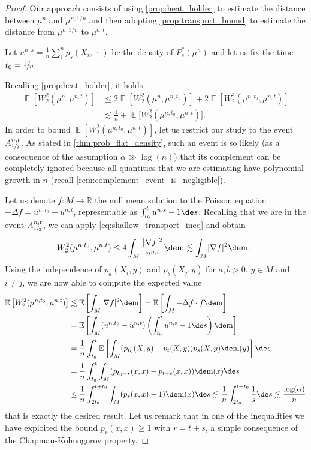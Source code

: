 \documentclass[JEP,XML,SOM,Unicode]{cedram}
\theoremstyle{plain}
\theoremstyle{definition}
\numberwithin{equation}{section}
\newcommand{\RR}{\ensuremath{\mathbb R}}
\newcommand{\E}[1]{\ensuremath{\operatorname{\mathbb{E}}\left[#1\right]}}
\newcommand{\bE}[1]{\ensuremath{\operatorname{\mathbb{E}}\bigl[#1\bigr]}}
\newcommand{\emptyparam}{\ensuremath{\,\cdot\,}}
\newcommand{\lapl}{\ensuremath{\Delta}}
\newcommand{\fullstop}{\ensuremath{\text{. }}}
\newcommand{\m}{\ensuremath{\mathrm m}}
\DeclarePairedDelimiter\abs{\lvert}{\rvert}
\begin{document}
\begin{proof}
Our approach consists of using \cref{prop:heat_holder} to estimate the distance between $\mu^n$ and
$\mu^{n,1/n}$ and then adopting \cref{prop:transport_bound} to estimate the distance
from $\mu^{n,1/n}$ to $\mu^{n,t}$.

Let $u^{n,s}=\frac 1n\sum_1^np_s(X_i,\emptyparam)$ be the density of $P_s^*(\mu^n)$ and
let us fix the time $t_0=\sfrac1n$.

Recalling \cref{prop:heat_holder}, it holds
\begin{align*}
\E{W_2^2(\mu^n, \mu^{n,t})}&\le 2\E{W_2^2(\mu^n, \mu^{n,t_0})} + 2\E{W_2^2(\mu^{n,t_0}, \mu^{n,t})} \\
&\lesssim \frac1n + \bE{W_2^2(\mu^{n,t_0}, \mu^{n,t})}.
\end{align*}
In order to bound $\E{W_2^2(\mu^{n,t_0}, \mu^{n,t})}$, let us restrict our study to the event
$A^{n,t}_{\sfrac12}$.
As stated in \cref{thm:prob_flat_density}, such an event is so likely (as a consequence of the
assumption $\alpha\gg\log(n)$) that its complement can be completely ignored because all
quantities that we are estimating have polynomial growth in $n$ (recall
\cref{rem:complement_event_is_negligible}).

Let us denote $f:M\to\RR$ the null mean solution to the Poisson equation $-\lapl f = u^{n,t_0}-u^{n,t}$,
representable as $\int_{t_0}^t u^{n,s}-1\de s$.
Recalling that we are in the event $A^{n,t}_{\sfrac12}$, we can apply \cref{eq:shallow_transport_ineq}
and obtain
\begin{equation*}
W_2^2(\mu^{n,t_0}, \mu^{n,t})\le
4\int_M \frac{\abs{\nabla f}^2}{u^{n,t}}\de\m \lesssim \int_M \abs{\nabla f}^2\de\m \fullstop
\end{equation*}
Using the independence of $p_a(X_i,y)$ and $p_b(X_j,y)$ for $a,b>0$, $y\in M$ and $i\neq j$,
we are now able to compute the expected value
\begin{align*}
\E{W_2^2(\mu^{n,t_0}, \mu^{n,t})} &\lesssim
\E{\int_M \abs{\nabla f}^2\de\m}
= \E{\int_M -\lapl f \cdot f\de\m} \\
&= \E{\int_M (u^{n,t_0}-u^{n,t})\left(\int_{t_0}^t u^{n,s}-1\de s\right)\de\m} \\
&=\frac1n\int_{t_0}^t\E{\int_M (p_{t_0}(X, y)-p_t(X,y))p_s(X,y)\de\m(y)} \de s \\
&=\frac1n\int_{t_0}^t\int_M (p_{t_0+s}(x, x)-p_{t+s}(x,x))\de\m(x) \de s\\
&\le \frac1n\int_{2t_0}^{t+t_0}\int_M (p_{s}(x, x)-1)\de\m(x) \de s
\lesssim\frac1n\int_{2t_0}^{t+t_0}\frac1s \de s
\lesssim \frac{\log(\alpha)}{n}
\end{align*}
that is exactly the desired result. Let us remark that in one of the inequalities we have exploited
the bound $p_r(x, x )\ge 1$ with $r=t+s$, a simple consequence of the Chapman-Kolmogorov property.
\end{proof}
\end{document}
